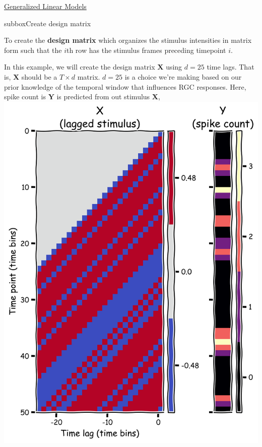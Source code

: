 \let\clearpage\relax
\begin{textbox}{\href{https://compneuro.neuromatch.io/tutorials/W1D3_GeneralizedLinearModels/student/W1D3_Tutorial1.html}{Generalized Linear Models } }
\begin{subbox}{subbox}{Create design matrix}
\scriptsize

To create the \textbf{design matrix} which organizes the stimulus intensities in matrix form such that the $i$th row has the stimulus frames preceding timepoint $i$.

In this example, we will create the design matrix $\mathbf{X}$ using $d=25$ time lags. That is, $\mathbf{X}$ should be a $T \times d$ matrix. $d = 25$  is a choice we're making based on our prior knowledge of the temporal window that influences RGC responses. 
Here, spike count is $\mathbf{Y}$ is predicted from out stimulus $\mathbf{X}$,
\centering
\includegraphics[scale=0.11]{Figures/GLM/GLMFigure1.png}
\end{subbox}


\end{textbox}

